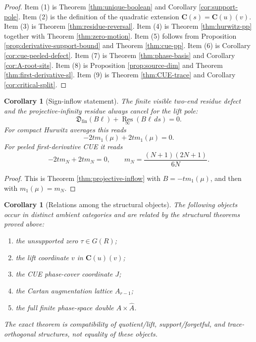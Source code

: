 \documentclass[11pt]{article}
\newcommand{\C}{\mathbf C}
\newcommand{\Res}{\operatorname*{Res}}
\theoremstyle{plain}
\newtheorem{corollary}[theorem]{Corollary}
\theoremstyle{definition}
\begin{document}
\begin{proof}
Item (1) is Theorem \ref{thm:unique-boolean} and Corollary \ref{cor:support-pole}.  Item (2) is the definition of the quadratic extension \(\C(s)=\C(u)(v)\).  Item (3) is Theorem \ref{thm:residue-reversal}.  Item (4) is Theorem \ref{thm:hurwitz-pp} together with Theorem \ref{thm:zero-motion}.  Item (5) follows from Proposition \ref{prop:derivative-support-bound} and Theorem \ref{thm:cue-pp}.  Item (6) is Corollary \ref{cor:cue-peeled-defect}.  Item (7) is Theorem \ref{thm:phase-basis} and Corollary \ref{cor:A-root-sits}.  Item (8) is Proposition \ref{prop:source-dim} and Theorem \ref{thm:first-derivative-sl}.  Item (9) is Theorem \ref{thm:CUE-trace} and Corollary \ref{cor:critical-split}.
\end{proof}

\begin{corollary}[Sign-inflow statement]\label{cor:sign-inflow}
The finite visible two-end residue defect and the projective-infinity residue always cancel for the lift pole:
\[
   \mathfrak D_{\operatorname{fin}}(B\ell)+\Res_{\infty}(B\ell\,ds)=0.
\]
For compact Hurwitz averages this reads
\[
   -2tm_1(\mu)+2tm_1(\mu)=0.
\]
For peeled first-derivative CUE it reads
\[
   -2tm_N+2tm_N=0,
   \qquad
   m_N=\frac{(N+1)(2N+1)}{6N}.
\]
\end{corollary}

\begin{proof}
This is Theorem \ref{thm:projective-inflow} with \(B=-tm_1(\mu)\), and then with \(m_1(\mu)=m_N\).
\end{proof}

\begin{corollary}[Relations among the structural objects]\label{cor:non-identifications}
The following objects occur in distinct ambient categories and are related by the structural theorems proved above:
\begin{enumerate}[label=\textup{(\arabic*)}]
\item the unsupported zero \(\tau\in G(R)\);
\item the lift coordinate \(v\) in \(\C(u)(v)\);
\item the CUE phase-cover coordinate \(J\);
\item the Cartan augmentation lattice \(A_{r-1}\);
\item the full finite phase-space double \(A\times\widehat A\).
\end{enumerate}
The exact theorem is compatibility of quotient/lift, support/forgetful, and trace-orthogonal structures, not equality of these objects.
\end{corollary}
\end{document}
